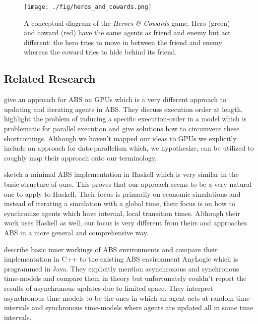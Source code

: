 \begin{figure}
	\centering
	\texttt{[image: ./fig/heros\_and\_cowards.png]}
	\caption{A conceptual diagram of the \textit{Heroes \& Cowards} game. Hero (green) and coward (red) have the same agents as friend and enemy but act different: the hero tries to move in between the friend and enemy whereas the coward tries to hide behind its friend.}
	\label{fig:heros_and_cowards}
\end{figure}

\subsection{Related Research}
\cite{a_framework_2008} give an approach for ABS on GPUs which is a very different approach to updating and iterating agents in ABS. They discuss execution order at length, highlight the problem of inducing a specific execution-order in a model which is problematic for parallel execution and give solutions how to circumvent these shortcomings. Although we haven't mapped our ideas to GPUs we explicitly include an approach for data-parallelism which, we hypothesize, can be utilized to roughly map their approach onto our terminology. 
	
\medskip
	
\cite{botta_time_2010} sketch a minimal ABS implementation in Haskell which is very similar in the basic structure of ours. This proves that our approach seems to be a very natural one to apply to Haskell. Their focus is primarily on economic simulations and instead of iterating a simulation with a global time, their focus is on how to synchronize agents which have internal, local transition times. Although their work uses Haskell as well, our focus is very different from theirs and approaches ABS in a more general and comprehensive way.

\medskip

\cite{dawson_opening_2014} describe basic inner workings of ABS environments and compare their implementation in C++ to the existing ABS environment AnyLogic which is programmed in Java. They explicitly mention asynchronous and synchronous time-models and compare them in theory but unfortunately couldn't report the results of asynchronous updates due to limited space. They interpret asynchronous time-models to be the ones in which an agent acts at random time intervals and synchronous time-models where agents are updated all in same time intervals.

\medskip

